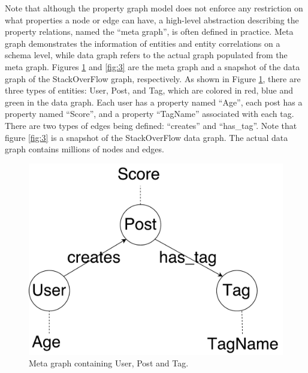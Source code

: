Note that although the property graph model does not enforce any restriction on what properties a node or edge can have, a high-level abstraction describing the property relations, named the ``meta graph'', is often defined in practice. Meta graph demonstrates the information of entities and entity correlations on a schema level, while data graph refers to the actual graph populated from the meta graph. Figures \ref{fig:2} and \ref{fig:3} are the meta graph and a snapshot of the data graph of the StackOverFlow graph, respectively. As shown in Figure \ref{fig:2}, there are three types of entities: User, Post, and Tag, which are colored in red, blue and green in the data graph. Each user has a property named ``Age'', each post has a property named ``Score'', and a property ``TagName'' associated with each tag. There are two types of edges being  defined: ``creates'' and ``has\_tag''. Note that figure \ref{fig:3} is a snapshot of the StackOverFlow data graph. The actual data graph contains millions of nodes and edges. 


\begin{figure}
	\centering
	\includegraphics[scale=0.35]{pic/12.pdf}
	\caption{Meta graph containing User, Post and Tag.}
	\label{fig:2}
\end{figure}

